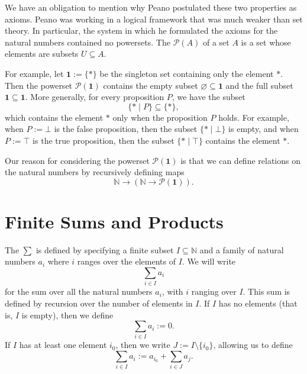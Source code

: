 \begin{remark}
  We have an obligation to mention why Peano postulated these two properties as axioms. Peano was working in a logical framework that was much weaker than set theory. In particular, the system in which he formulated the axioms for the natural numbers contained no powersets. The  $\mathcal{P}(A)$ of a set $A$ is a set whose elements are subsets $U\subseteq A$.
  
  For example, let $\symbf{1}:=\{\ast\}$ be the singleton set containing only the element $\ast$. Then the powerset $\mathcal{P}(\symbf{1})$ contains the empty subset $\varnothing\subseteq \symbf{1}$ and the full subset $\symbf{1}\subseteq\symbf{1}$. More generally, for every proposition $P$, we have the subset
  \begin{equation*}
    \{\ast\mid P\}\subseteq \{\ast\},
  \end{equation*}
  which contains the element $\ast$ only when the proposition $P$ holds. For example, when $P:=\bot$ is the false proposition, then the subset $\{\ast\mid\bot\}$ is empty, and when $P:=\top$ is the true proposition, then the subset $\{\ast\mid\top\}$ contains the element $\ast$.
  
  Our reason for considering the powerset $\mathcal{P}(\symbf{1})$ is that we can define relations on the natural numbers by recursively defining maps
  \begin{equation*}
    \mathbb{N}\to (\mathbb{N}\to \mathcal{P}(\symbf{1})).
  \end{equation*}
\end{remark}

\section{Finite Sums and Products}

\begin{definition}
  The  $\sum$ is defined by specifying a finite subset $I\subseteq \mathbb{N}$ and a family of natural numbers $a_i$ where $i$ ranges over the elements of $I$. We will write
  \begin{equation*}
    \sum_{i\in I}a_i
  \end{equation*}
  for the sum over all the natural numbers $a_i$, with $i$ ranging over $I$. This sum is defined by recursion over the number of elements in $I$. If $I$ has no elements (that is, $I$ is empty), then we define
  \begin{equation*}
    \sum_{i\in I}a_i := 0.
  \end{equation*}
  If $I$ has at least one element $i_0$, then we write $J:=I\setminus\{i_0\}$, allowing us to define
  \begin{equation*}
    \sum_{i\in I}a_i := a_{i_0}+\sum_{i\in J}a_j.
  \end{equation*}
\end{definition}

